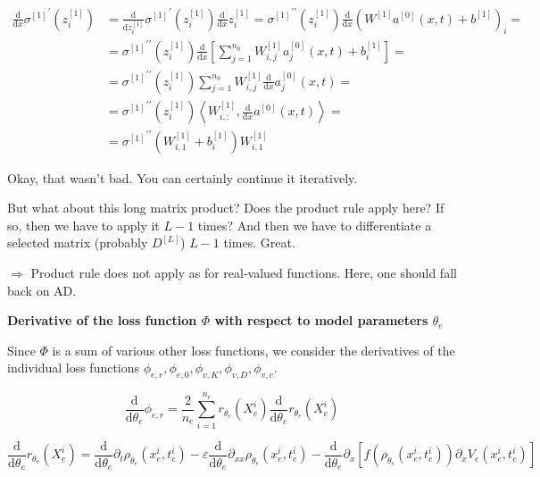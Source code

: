 \begin{align*}
    \frac{\mathrm{d}}{\mathrm{d} x} {\sigma^{[1]}}^{\prime} (z_{i}^{[1]}) & = \frac{\mathrm{d}}{\mathrm{d} z_{i}^{[1]}} {\sigma^{[1]}}^{\prime} (z_{i}^{[1]}) \frac{\mathrm{d}}{\mathrm{d} x} z_{i}^{[1]} = {\sigma^{[1]}}^{\prime \prime} (z_{i}^{[1]}) \frac{\mathrm{d}}{\mathrm{d} x} (W^{[1]} a^{[0]}(x,t) + b^{[1]})_i = \\
    & = {\sigma^{[1]}}^{\prime \prime} (z_{i}^{[1]}) \frac{\mathrm{d}}{\mathrm{d} x} \left[ \sum^{n_0}_{j=1} W^{[1]}_{i,j} a^{[0]}_{j}(x,t) + b^{[1]}_i \right] = \\
    & = {\sigma^{[1]}}^{\prime \prime} (z_{i}^{[1]}) \sum^{n_0}_{j=1} W^{[1]}_{i,j} \frac{\mathrm{d}}{\mathrm{d} x} a^{[0]}_{j}(x,t) = \\
    & = {\sigma^{[1]}}^{\prime \prime} (z_{i}^{[1]}) \left\langle W^{[1]}_{i, \colon}, \frac{\mathrm{d}}{\mathrm{d} x} a^{[0]}(x,t)  \right\rangle = \\
    & = {\sigma^{[1]}}^{\prime \prime} (W^{[1]}_{i, 1} + b^{[1]}_i) W^{[1]}_{i, 1}
\end{align*}

Okay, that wasn't bad. You can certainly continue it iteratively. 

But what about this long matrix product? Does the product rule apply here? If so, then we have to apply it $L-1$ times? And then we have to differentiate a selected matrix (probably $D^{[L]}$) $L-1$ times. Great.

$\Rightarrow$ Product rule does not apply as for real-valued functions. Here, one should fall back on AD. 


\textbf{Derivative of the loss function $\Phi$ with respect to model parameters $\theta_e$}

Since $\Phi$ is a sum of various other loss functions, we consider the derivatives of the individual loss functions $\phi_{e,r}, \phi_{e,0}, \phi_{v,K}, \phi_{v,D}, \phi_{v,c}$. 

\begin{equation*}
    \frac{\mathrm{d}}{\mathrm{d} \theta_e} \phi_{e,r} = \frac{2}{n_e} \sum_{i=1}^{n_e} r_{\theta_e} (X_e^i) \frac{\mathrm{d}}{\mathrm{d} \theta_e} r_{\theta_e} (X_e^i) 
\end{equation*}

\begin{equation*}
    \frac{\mathrm{d}}{\mathrm{d} \theta_e} r_{\theta_e} (X_e^i) =  \frac{\mathrm{d}}{\mathrm{d} \theta_e} \partial_t \rho_{\theta_{e}} (x_{e}^i , t_{e}^i) - \varepsilon \frac{\mathrm{d}}{\mathrm{d} \theta_e} \partial_{xx} \rho_{\theta_e}(x_e^i, t_e^i) - \frac{\mathrm{d}}{\mathrm{d} \theta_e} \partial_x [f(\rho_{\theta_e}(x_e^i, t_e^i)) \partial_x V_e(x_e^i, t_e^i)] 
\end{equation*}

